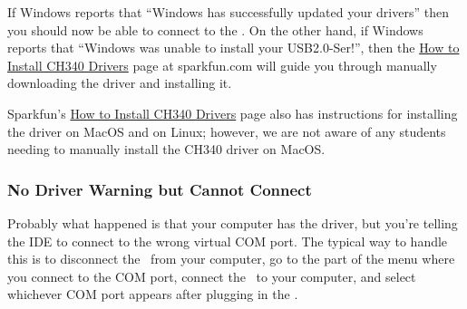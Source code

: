 If Windows reports that ``Windows has successfully updated your drivers'' then you should now be able to connect to the \developmentboard.
On the other hand, if Windows reports that ``Windows was unable to install your USB2.0-Ser!'', then the \href{https://learn.sparkfun.com/tutorials/how-to-install-ch340-drivers/}{How to Install CH340 Drivers} page at sparkfun.com will guide you through manually downloading the driver and installing it.

Sparkfun's \href{https://learn.sparkfun.com/tutorials/how-to-install-ch340-drivers/}{How to Install CH340 Drivers} page also has instructions for installing the driver on MacOS and on Linux;
however, we are not aware of any students needing to manually install the CH340 driver on MacOS\@.

\subsubsection{No Driver Warning but Cannot Connect}

Probably what happened is that your computer has the driver, but you're telling the IDE to connect to the wrong virtual COM port.
The typical way to handle this is to disconnect the \developmentboard\ from your computer, go to the part of the menu where you connect to the COM port, connect the \developmentboard\ to your computer, and select whichever COM port appears after plugging in the \developmentboard.
